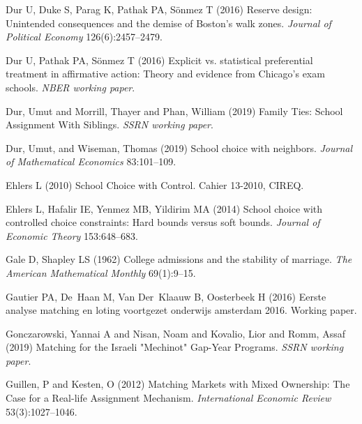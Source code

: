 \begin{thebibliography}{36}
Dur U, Duke S, Parag K, Pathak PA, S{\"{o}}nmez T (2016{}) {Reserve
  design: Unintended consequences and the demise of Boston's walk zones}.
  \emph{Journal of Political Economy} 126(6):2457--2479.

Dur U, Pathak PA, S{\"{o}}nmez T (2016{}) {Explicit vs. statistical preferential treatment in affirmative action: Theory and evidence from Chicago's exam schools}. \emph{NBER working paper}.

Dur, Umut and Morrill, Thayer and Phan, William (2019) {Family Ties: School Assignment With Siblings}. \emph{SSRN working paper}.

Dur, Umut, and Wiseman, Thomas (2019) School choice with neighbors. \emph{Journal of Mathematical Economics} 83:101--109.

Ehlers L (2010) {School Choice with Control}. Cahier 13-2010, CIREQ.

Ehlers L, Hafalir IE, Yenmez MB, Yildirim MA (2014) School choice with
  controlled choice constraints: Hard bounds versus soft bounds. \emph{Journal
  of Economic Theory} 153:648--683.

Gale D, Shapley LS (1962) College admissions and the stability of marriage.
  \emph{The American Mathematical Monthly} 69(1):9--15.

Gautier PA, De~Haan M, Van Der~Klaauw B, Oosterbeek H (2016) Eerste analyse
  matching en loting voortgezet onderwijs amsterdam 2016. Working paper.

  Gonczarowski, Yannai A and Nisan, Noam and Kovalio, Lior and Romm, Assaf (2019) Matching for the Israeli "Mechinot" Gap-Year Programs. \emph{SSRN working paper}.

Guillen, P and Kesten, O (2012) Matching Markets with Mixed Ownership: The Case for a Real-life Assignment Mechanism. \emph{International Economic Review} 53(3):1027--1046.



\end{thebibliography}
